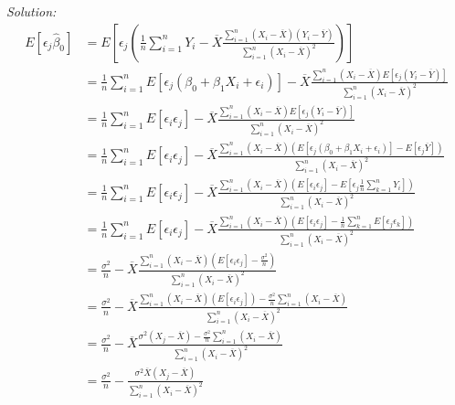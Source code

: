 \documentclass{article}
\newenvironment{solution}
    {\textit{Solution:}}
    {}
\begin{document}
\begin{solution}
\begin{align*}
E[\epsilon_j \hat \beta_0] &= E \left [ \epsilon_j  \left (\frac{1}{n} \sum_{i = 1}^n Y_i -  \overline{X} \frac{\sum_{i = 1}^n (X_i - \overline{X}) (Y_i - \overline{Y})}{\sum_{i = 1}^n (X_i - \overline X)^2} \right) \right] \\
&=   \frac{1}{n} \sum_{i = 1}^n E [ \epsilon_j (\beta_0 + \beta_1 X_i + \epsilon_i)] -  \overline{X} \frac{\sum_{i = 1}^n (X_i - \overline{X}) E[ \epsilon_j (Y_i - \overline{Y})]}{\sum_{i = 1}^n (X_i - \overline X)^2} \\
&=   \frac{1}{n} \sum_{i = 1}^n E [  \epsilon_i \epsilon_j] -  \overline{X} \frac{\sum_{i = 1}^n (X_i - \overline{X}) E[ \epsilon_j (Y_i - \overline{Y})]}{\sum_{i = 1}^n (X_i - \overline X)^2} \\
&=   \frac{1}{n} \sum_{i = 1}^n E [  \epsilon_i \epsilon_j] -  \overline{X} \frac{\sum_{i = 1}^n (X_i - \overline{X}) \left ( E[ \epsilon_j (\beta_0 + \beta_1 X_i + \epsilon_i)] - E[ \epsilon_j \overline{Y}] \right)}{\sum_{i = 1}^n (X_i - \overline X)^2} \\
&=   \frac{1}{n} \sum_{i = 1}^n E [  \epsilon_i \epsilon_j] -  \overline{X} \frac{\sum_{i = 1}^n (X_i - \overline{X}) \left ( E[\epsilon_i \epsilon_j ] - E[ \epsilon_j \frac{1}{n} \sum_{k =  1}^n Y_i] \right)}{\sum_{i = 1}^n (X_i - \overline X)^2} \\
&=   \frac{1}{n} \sum_{i = 1}^n E [  \epsilon_i \epsilon_j] -  \overline{X} \frac{\sum_{i = 1}^n (X_i - \overline{X}) \left ( E[\epsilon_i \epsilon_j ] - \frac{1}{n} \sum_{k =  1}^n E[\epsilon_j \epsilon_k ] \right)}{\sum_{i = 1}^n (X_i - \overline X)^2} \\
&=   \frac{\sigma^2}{n}  -  \overline{X} \frac{\sum_{i = 1}^n (X_i - \overline{X}) \left ( E[\epsilon_i \epsilon_j ] - \frac{\sigma^2}{n}  \right)}{\sum_{i = 1}^n (X_i - \overline X)^2} \\
&=   \frac{\sigma^2}{n}  -  \overline{X} \frac{\sum_{i = 1}^n (X_i - \overline{X}) ( E[\epsilon_i \epsilon_j ] ) -  \frac{\sigma^2}{n}  \sum_{i = 1}^n (X_i - \overline{X})}{\sum_{i = 1}^n (X_i - \overline X)^2} \\
&=   \frac{\sigma^2}{n}  -  \overline{X} \frac{\sigma^2 (X_j - \overline{X})-  \frac{\sigma^2}{n}  \sum_{i = 1}^n (X_i - \overline{X})}{\sum_{i = 1}^n (X_i - \overline X)^2} \\
&=   \frac{\sigma^2}{n}  -  \frac{\sigma^2 \overline{X} (X_j - \overline{X})}{\sum_{i = 1}^n (X_i - \overline X)^2} 
\end{align*}


\end{solution}
\end{document}

